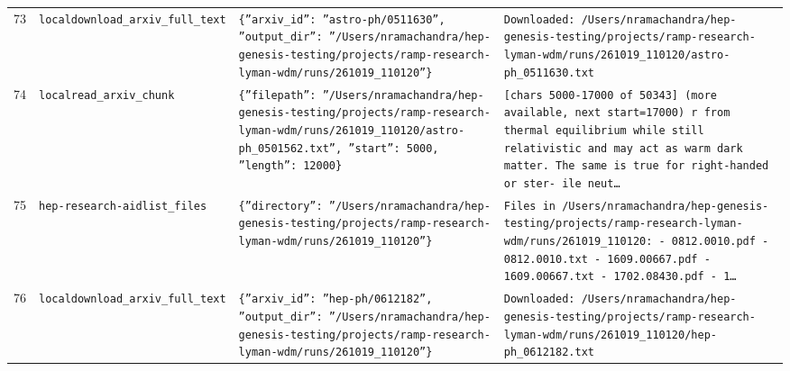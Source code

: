 \documentclass[11pt,a4paper]{article}
\begin{document}
\begin{longtable}{@{}p{}p{}p{}p{}@{}}
73 & \texttt{local}\newline\texttt{download\_\allowbreak{}arxiv\_\allowbreak{}full\_\allowbreak{}text} & \texttt{\{''arxiv\_\allowbreak{}id'':\allowbreak{} ''astro-ph/\allowbreak{}0511630'',\allowbreak{} ''output\_\allowbreak{}dir'':\allowbreak{} ''/\allowbreak{}Users/\allowbreak{}nramachandra/\allowbreak{}hep-genesis-testing/\allowbreak{}projects/\allowbreak{}ramp-research-lyman-wdm/\allowbreak{}runs/\allowbreak{}261019\_\allowbreak{}110120''\}\allowbreak{}} & \texttt{Downloaded:\allowbreak{} /\allowbreak{}Users/\allowbreak{}nramachandra/\allowbreak{}hep-genesis-testing/\allowbreak{}projects/\allowbreak{}ramp-research-lyman-wdm/\allowbreak{}runs/\allowbreak{}261019\_\allowbreak{}110120/\allowbreak{}astro-ph\_\allowbreak{}0511630.txt} \\
74 & \texttt{local}\newline\texttt{read\_\allowbreak{}arxiv\_\allowbreak{}chunk} & \texttt{\{''filepath'':\allowbreak{} ''/\allowbreak{}Users/\allowbreak{}nramachandra/\allowbreak{}hep-genesis-testing/\allowbreak{}projects/\allowbreak{}ramp-research-lyman-wdm/\allowbreak{}runs/\allowbreak{}261019\_\allowbreak{}110120/\allowbreak{}astro-ph\_\allowbreak{}0501562.txt'',\allowbreak{} ''start'':\allowbreak{} 5000,\allowbreak{} ''length'':\allowbreak{} 12000\}\allowbreak{}} & \texttt{[chars 5000-17000 of 50343]\allowbreak{} (more available,\allowbreak{} next start=\allowbreak{}17000)\allowbreak{}  r from thermal equilibrium while still relativistic and may act as warm dark matter. The same is true for right-handed or ster- ile neut\ldots{}\allowbreak{}} \\
75 & \texttt{hep-research-aid}\newline\texttt{list\_\allowbreak{}files} & \texttt{\{''directory'':\allowbreak{} ''/\allowbreak{}Users/\allowbreak{}nramachandra/\allowbreak{}hep-genesis-testing/\allowbreak{}projects/\allowbreak{}ramp-research-lyman-wdm/\allowbreak{}runs/\allowbreak{}261019\_\allowbreak{}110120''\}\allowbreak{}} & \texttt{Files in /\allowbreak{}Users/\allowbreak{}nramachandra/\allowbreak{}hep-genesis-testing/\allowbreak{}projects/\allowbreak{}ramp-research-lyman-wdm/\allowbreak{}runs/\allowbreak{}261019\_\allowbreak{}110120:\allowbreak{}   - 0812.0010.pdf   - 0812.0010.txt   - 1609.00667.pdf   - 1609.00667.txt   - 1702.08430.pdf   - 1\ldots{}\allowbreak{}} \\
76 & \texttt{local}\newline\texttt{download\_\allowbreak{}arxiv\_\allowbreak{}full\_\allowbreak{}text} & \texttt{\{''arxiv\_\allowbreak{}id'':\allowbreak{} ''hep-ph/\allowbreak{}0612182'',\allowbreak{} ''output\_\allowbreak{}dir'':\allowbreak{} ''/\allowbreak{}Users/\allowbreak{}nramachandra/\allowbreak{}hep-genesis-testing/\allowbreak{}projects/\allowbreak{}ramp-research-lyman-wdm/\allowbreak{}runs/\allowbreak{}261019\_\allowbreak{}110120''\}\allowbreak{}} & \texttt{Downloaded:\allowbreak{} /\allowbreak{}Users/\allowbreak{}nramachandra/\allowbreak{}hep-genesis-testing/\allowbreak{}projects/\allowbreak{}ramp-research-lyman-wdm/\allowbreak{}runs/\allowbreak{}261019\_\allowbreak{}110120/\allowbreak{}hep-ph\_\allowbreak{}0612182.txt} \\

\end{longtable}
\end{document}
